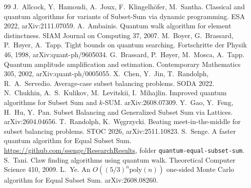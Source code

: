 \documentclass[11pt]{article}
\theoremstyle{remark}
\begin{document}
\begin{thebibliography}{99}
 J.~Allcock, Y.~Hamoudi, A.~Joux, F.~Klingelh\"ofer, M.~Santha. Classical and quantum algorithms for variants of Subset-Sum via dynamic programming. ESA 2022, arXiv:2111.07059.
 A.~Ambainis. Quantum walk algorithm for element distinctness. SIAM Journal on Computing 37, 2007.
 M.~Boyer, G.~Brassard, P.~H\o yer, A.~Tapp. Tight bounds on quantum searching. Fortschritte der Physik 46, 1998, arXiv:quant-ph/9605034.
 G.~Brassard, P.~H\o yer, M.~Mosca, A.~Tapp. Quantum amplitude amplification and estimation. Contemporary Mathematics 305, 2002, arXiv:quant-ph/0005055.
 X.~Chen, Y.~Jin, T.~Randolph, R.~A.~Servedio. Average-case subset balancing problems. SODA 2022.
 N.~Chukhin, A.~S.~Kulikov, M.~Levitskii, I.~Mihajlin. Improved quantum algorithms for Subset Sum and $k$-SUM. arXiv:2608.07309.
 Y.~Gao, Y.~Feng, H.~Hu, Y.~Pan. Subset Balancing and Generalized Subset Sum via Lattices. arXiv:2604.04656.
 T.~Randolph, K.~W\k{e}grzycki. Beating meet-in-the-middle for subset balancing problems. STOC 2026, arXiv:2511.10823.
 S.~Senge. A faster quantum algorithm for Equal Subset Sum. \url{https://github.com/ssenge/ResearchResults}, folder \texttt{quantum-equal-subset-sum}.
 S.~Tani. Claw finding algorithms using quantum walk. Theoretical Computer Science 410, 2009.
 L.~Ye. An $O((5/3)^n\mathrm{poly}(n))$ one-sided Monte Carlo algorithm for Equal Subset Sum. arXiv:2608.08260.
\end{thebibliography}
\end{document}

